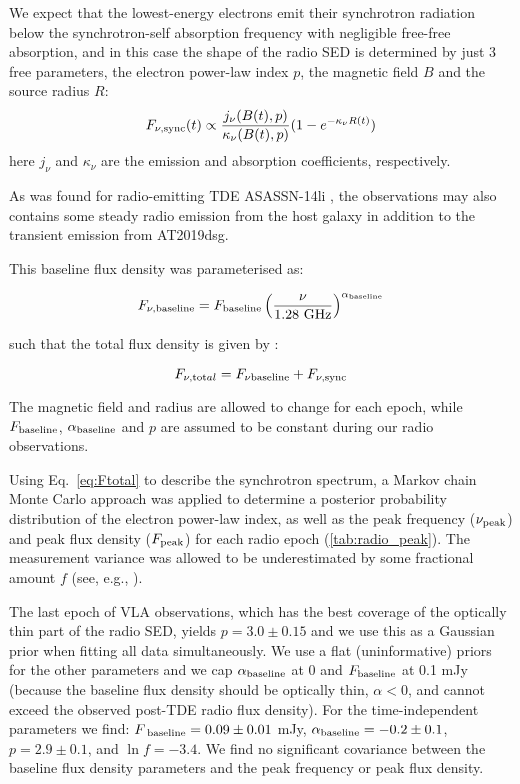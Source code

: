 We expect that the lowest-energy electrons emit their synchrotron radiation below the synchrotron-self absorption frequency with negligible free-free absorption, and in this case the shape of the radio SED is determined by just 3 free parameters, the electron power-law index $p$, the magnetic field $B$ and the source radius $R$: 
\begin{equation}\label{eq:Fsync}
F_{\nu,  \textup{sync}}(t) \propto \frac{j_\nu(B(t), p)}{\kappa_\nu(B(t), p)} (1-e^{-\kappa_\nu R(t)})
\end{equation}
here $j_\nu$ and $\kappa_\nu$ are the emission and absorption coefficients, respectively. 

As was found for radio-emitting TDE ASASSN-14li , the observations may also contains some steady radio emission from the host galaxy in addition to the transient emission from AT2019dsg. 

This baseline flux density was parameterised as:

\begin{equation}\label{eq:Fhost}
F_{\nu, \textup{baseline}} = F_{ \textup{baseline}} \left(\frac{\nu}{1.28 \textup{ GHz}}\right)^{\alpha_{ \textup{baseline}}}
\end{equation}

such that the total flux density is given by :

\begin{equation}\label{eq:Ftotal}
F_{\nu,  \textup{tot}al} = F_{\nu \textup{baseline}} + F_{\nu,  \textup{sync}} 
\end{equation}

The magnetic field and radius are allowed to change for each epoch, while $F_{ \textup{baseline}}$, $\alpha_{ \textup{baseline}}$ and $p$ are assumed to be constant during our radio observations. 

Using Eq.~\ref{eq:Ftotal} to describe the synchrotron spectrum, a Markov chain Monte Carlo approach  was applied to determine a posterior probability distribution of the electron power-law index, as well as the peak frequency ($\nu_{ \textup{peak}}$) and peak flux density ($F_{ \textup{peak}}$) for each radio epoch (\ref{tab:radio_peak}). The measurement variance was allowed to be underestimated by some fractional amount $f$ (see, e.g., ). 

The last epoch of VLA observations, which has the best coverage of the optically thin part of the radio SED, yields $p=3.0 \pm 0.15$ and we use this as a Gaussian prior when fitting all data simultaneously.  We use a flat (uninformative) priors for the other parameters and we cap $\alpha_{\textup{baseline}}$ at 0 and $F_{\textup{baseline}}$ at 0.1 mJy (because the baseline flux density should be optically thin, $\alpha < 0$, and cannot exceed the observed post-TDE radio flux density). For the time-independent parameters we find: $F_{\textup{ baseline}}=0.09\pm 0.01$ mJy, $\alpha_{\textup{baseline}} = -0.2\pm 0.1$, $p = 2.9 \pm 0.1$, and $\ln f=-3.4$. We find no significant covariance between the baseline flux density parameters and the peak frequency or peak flux density. 

